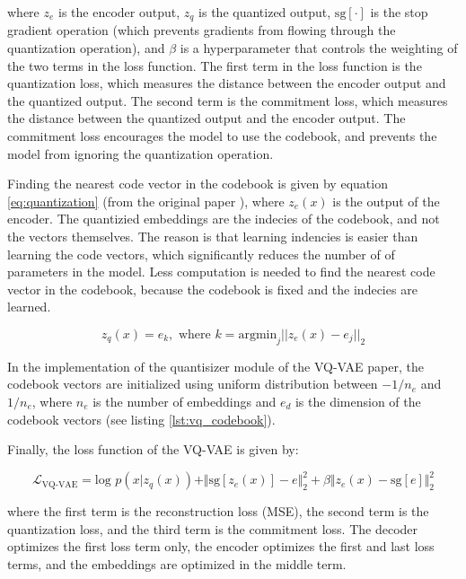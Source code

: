 where $z_e$ is the encoder output, $z_q$ is the quantized output, $\text{sg}[\cdot]$ is the stop gradient operation (which prevents gradients from flowing through the quantization operation), and $\beta$ is a hyperparameter that controls the weighting of the two terms in the loss function. The first term in the loss function is the quantization loss, which measures the distance between the encoder output and the quantized output. The second term is the commitment loss, which measures the distance between the quantized output and the encoder output. The commitment loss encourages the model to use the codebook, and prevents the model from ignoring the quantization operation.

Finding the nearest code vector in the codebook is given by equation \ref{eq:quantization} (from the original paper \cite{vqvae}), where $z_e(x)$ is the output of the encoder. The quantizied embeddings are the indecies of the codebook, and not the vectors themselves. The reason is that learning indencies is easier than learning the code vectors, which significantly reduces the number of of parameters in the model. Less computation is needed to find the nearest code vector in the codebook, because the codebook is fixed and the indecies are learned.

\begin{equation}
    \label{eq:quantization}
    z_q(x)=e_k, \text{  where } k = \text{argmin}_j || z_e(x) - e_j ||_2
\end{equation}

In the implementation of the quantisizer module of the VQ-VAE paper, the codebook vectors are initialized using uniform distribution between $-1/n_e$ and $1/n_e$, where $n_e$ is the number of embeddings and $e_d$ is the dimension of the codebook vectors (see listing \ref{lst:vq_codebook}).

Finally, the loss function of the VQ-VAE is given by:

\begin{equation}
    \mathcal{L}_\text{VQ-VAE} = \text{log } p(x|z_q(x)) + \Vert \text{sg}[z_e(x)] - e \Vert_2^2 + \beta \Vert z_e(x) - \text{sg}[e] \Vert_2^2
\end{equation}
    
    where the first term is the reconstruction loss (MSE), the second term is the quantization loss, and the third term is the commitment loss. The decoder optimizes the first loss term only, the encoder optimizes the first and last loss terms, and the embeddings are optimized in the middle term.






